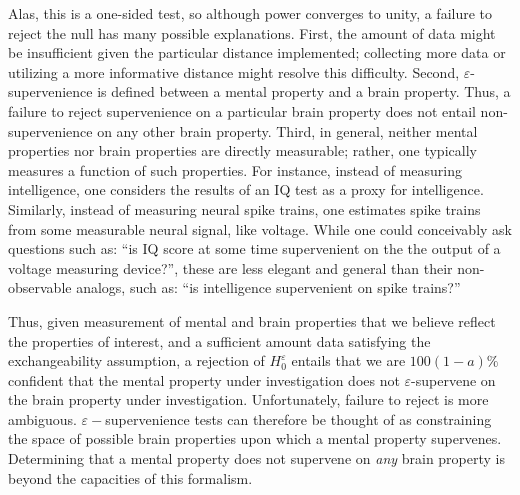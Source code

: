 \documentclass{article}
\newcommand{\eps}{\varepsilon}
\begin{document}
Alas, this is a one-sided test, so although power converges to unity, %
a failure to reject the null has many possible explanations.  First, the amount of data might be insufficient given the particular distance implemented; collecting more data or utilizing a more informative distance might resolve this difficulty.  Second, $\eps$-supervenience is defined between a mental property and a brain property.  Thus, a failure to reject supervenience on a particular brain property does not entail non-supervenience on any other brain property.  Third, in general, neither mental properties nor brain properties are directly measurable; rather, one typically measures a function of such properties.  For instance, instead of measuring intelligence, one considers the results of an IQ test as a proxy for intelligence.  Similarly, instead of measuring neural spike trains, one estimates spike trains from some measurable neural signal, like voltage.  While one could conceivably ask questions such as: ``is IQ score at some time supervenient on the the output of a voltage measuring device?'', these are less elegant and general than their non-observable analogs, such as: ``is intelligence supervenient on spike trains?''

Thus, given measurement of mental and brain properties that we believe reflect the properties of interest, and a sufficient amount data satisfying the exchangeability assumption, a rejection of $H_0^\eps$ entails that we are $100(1-a)\%$ confident that the mental property under investigation does not $\eps$-supervene on the brain property under investigation.  Unfortunately, failure to reject is more ambiguous. $\eps-$supervenience tests can therefore be thought of as constraining the space of possible brain properties upon which a mental property supervenes.  Determining that a mental property does not supervene on \emph{any} brain property is beyond the capacities of this formalism.
\end{document}
